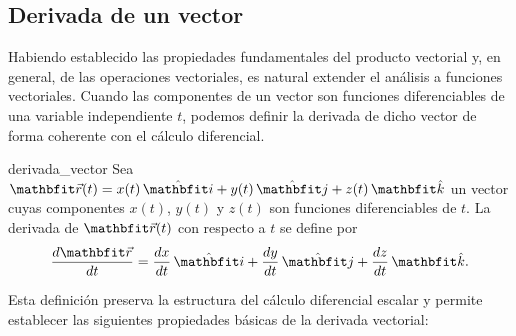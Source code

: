 \subsection{Derivada de un vector}

Habiendo establecido las propiedades fundamentales del producto vectorial y, en general, de las operaciones vectoriales, es natural extender el análisis a funciones vectoriales. Cuando las componentes de un vector son funciones diferenciables de una variable independiente $t$, podemos definir la derivada de dicho vector de forma coherente con el cálculo diferencial.

\begin{definition}{}{derivada_vector}
    Sea $\vecr(t) = x(t)\,\veci + y(t)\,\vecj + z(t)\,\veck$ un vector cuyas componentes $x(t)$, $y(t)$ y $z(t)$ son funciones diferenciables de $t$. La derivada de $\vecr(t)$ con respecto a $t$ se define por
    $$\frac{d\vecr}{dt} = \frac{dx}{dt}\,\veci + \frac{dy}{dt}\,\vecj + \frac{dz}{dt}\,\veck.$$
\end{definition}

Esta definición preserva la estructura del cálculo diferencial escalar y permite establecer las siguientes propiedades básicas de la derivada vectorial:

